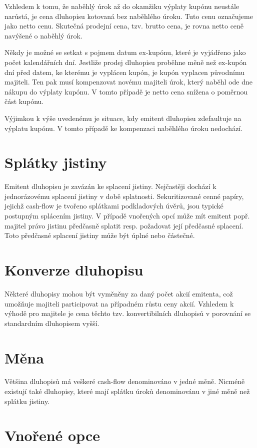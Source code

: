 \documentclass[a4paper]{book}
\begin{document}
Vzhledem k tomu, že naběhlý úrok až do okamžiku výplaty kupónu neustále narůstá, je cena dluhopisu kotovaná bez naběhlého úroku. Tuto cenu označujeme jako netto cenu. Skutečná prodejní cena, tzv. brutto cena, je rovna netto ceně navýšené o naběhlý úrok.

Někdy je možné se setkat s pojmem datum ex-kupónu, které je vyjádřeno jako počet kalendářních dní. Jestliže prodej dluhopisu proběhne měně než ex-kupón dní před datem, ke kterému je vyplácen kupón, je kupón vyplacen původnímu majiteli. Ten pak musí kompenzovat novému majiteli úrok, který naběhl ode dne nákupu do výplaty kupónu. V tomto případě je netto cena snížena o poměrnou část kupónu.

Výjimkou k výše uvedenému je situace, kdy emitent dluhopisu zdefaultuje na výplatu kupónu. V tomto případě ke kompenzaci naběhlého úroku nedochází.

\section{Splátky jistiny}

Emitent dluhopisu je zavázán ke splacení jistiny. Nejčastěji dochází k jednorázovému splacení jistiny v době splatnosti. Sekuritizované cenné papíry, jejichž cash-flow je tvořeno splátkami podkladových úvěrů, jsou typické postupným splácením jistiny. V případě vnořených opcí může mít emitent popř. majitel právo jistinu předčasně splatit resp. požadovat její předčasné splacení. Toto předčasné splacení jistiny může být úplné nebo částečné.

\section{Konverze dluhopisu}

Některé dluhopisy mohou být vyměněny za daný počet akcií emitenta, což umožňuje majiteli participovat na případném růstu ceny akcií. Vzhledem k výhodě pro majitele je cena těchto tzv. konvertibilních dluhopisů v porovnání se standardním dluhopisem vyšší.

\section{Měna}

Většina dluhopisů má veškeré cash-flow denominováno v jedné měně. Nicméně existují také dluhopisy, které mají splátku úroků denominovánu v jiné měně než splátku jistiny.

\section{Vnořené opce}
\end{document}
